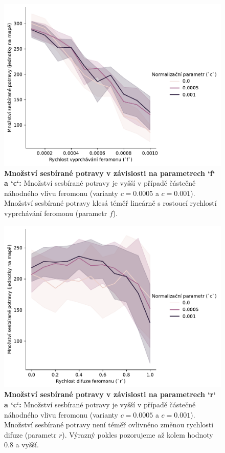 \documentclass[10pt,a4paper,twocolumn]{article}
\begin{document}
\begin{figure}[tb]
  \centering
  \includegraphics[width=0.9\linewidth]{images/grid_search_1_fade.pdf}
  \caption{\textbf{Množství sesbírané potravy v závislosti na parametrech `f` a `c`:}
  Množství sesbírané potravy je vyšší v případě částečně náhodného
  vlivu feromonu (varianty $c=0.0005$ a $c=0.001$). Množství sesbírané 
  potravy klesá téměř lineárně s rostoucí rychlostí vyprchávání feromonu 
  (parametr $f$).}
  \label{fig:grid_search_1_fade}
\end{figure}


\begin{figure}[tb]
  \centering
  \includegraphics[width=0.9\linewidth]{images/grid_search_1_difusion.pdf}
  \caption{\textbf{Množství sesbírané potravy v závislosti na parametrech `r` a `c`:}
  Množství sesbírané potravy je vyšší v případě částečně náhodného
  vlivu feromonu (varianty $c=0.0005$ a $c=0.001$). Množství sesbírané 
  potravy není téměř ovlivněno změnou rychlosti difuze (parametr $r$). 
  Výrazný pokles pozorujeme až kolem hodnoty $0.8$ a vyšší.}
  \label{fig:grid_search_1_difusion}
\end{figure}
\end{document}
